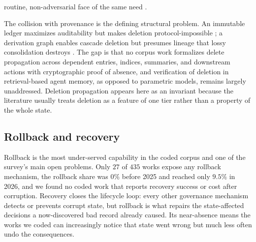 routine, non-adversarial face of the same need \citep{kumar2026memarchitect}.

The collision with provenance is the defining structural problem. An immutable ledger maximizes auditability but makes deletion protocol-impossible \citep{wright2025immutablemem}; a derivation graph enables cascade deletion but presumes lineage that lossy consolidation destroys \citep{ouyang2026memlineage,zhao2026memorepair}. The gap is that no corpus work formalizes delete propagation across dependent entries, indices, summaries, and downstream actions with cryptographic proof of absence, and verification of deletion in retrieval-based agent memory, as opposed to parametric models, remains largely unaddressed. Deletion propagation appears here as an invariant because the literature usually treats deletion as a feature of one tier rather than a property of the whole state.

\subsection{Rollback and recovery}

Rollback is the most under-served capability in the coded corpus and one of the survey's main open problems. Only $27$ of $435$ works expose any rollback mechanism, the rollback share was $0\%$ before 2025 and reached only $9.5\%$ in 2026, and we found no coded work that reports recovery success or cost after corruption. Recovery closes the lifecycle loop: every other governance mechanism detects or prevents corrupt state, but rollback is what repairs the state-affected decisions a now-discovered bad record already caused. Its near-absence means the works we coded can increasingly notice that state went wrong but much less often undo the consequences.

